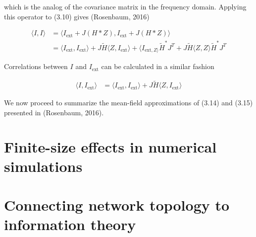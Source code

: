 \documentclass{ucetd}
\begin{document}
which is the analog of the covariance matrix in the frequency domain. Applying this operator to (3.10) gives (Rosenbaum, 2016)

\begin{align}
\langle I, I \rangle &= \langle I_{\mathrm{ext}} + J(H*Z), I_{\mathrm{ext}} + J(H*Z) \rangle\\
&= \langle I_{\mathrm{ext}}, I_{\mathrm{ext}}\rangle  + J\tilde{H}\langle Z, I_{\mathrm{ext}} \rangle + \langle I_{\mathrm{ext}, Z\rangle}\tilde{H}^{*}J^{T} + J\tilde{H}\langle Z, Z\rangle \tilde{H}^{*}J^{T}
\end{align}

Correlations between $I$ and $I_{\mathrm{ext}}$ can be calculated in a similar fashion

\begin{align}
\langle I, I_{\mathrm{ext}} \rangle &= \langle I_{\mathrm{ext}}, I_{\mathrm{ext}}\rangle + J\tilde{H} \langle Z, I_{\mathrm{ext}}\rangle
\end{align}

We now proceed to summarize the mean-field approximations of (3.14) and (3.15) presented in (Rosenbaum, 2016). 

\section{Finite-size effects in numerical simulations}

\section{Connecting network topology to information theory}
\end{document}
